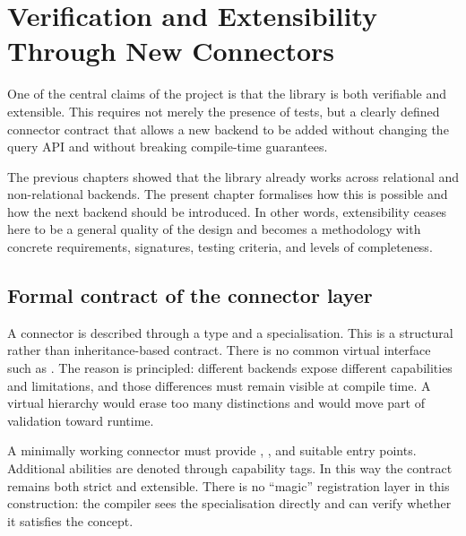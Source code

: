 \section{Verification and Extensibility Through New Connectors}
\label{sec:verification_extensibility}

One of the central claims of the project is that the library is both verifiable and extensible. This requires not merely the presence of tests, but a clearly defined connector contract that allows a new backend to be added without changing the query API and without breaking compile-time guarantees.

The previous chapters showed that the library already works across relational and non-relational backends. The present chapter formalises how this is possible and how the next backend should be introduced. In other words, extensibility ceases here to be a general quality of the design and becomes a methodology with concrete requirements, signatures, testing criteria, and levels of completeness.

\subsection{Formal contract of the connector layer}

A connector is described through a  type and a  specialisation. This is a structural rather than inheritance-based contract. There is no common virtual interface such as . The reason is principled: different backends expose different capabilities and limitations, and those differences must remain visible at compile time. A virtual hierarchy would erase too many distinctions and would move part of validation toward runtime.

A minimally working connector must provide , , and suitable  entry points. Additional abilities are denoted through capability tags. In this way the contract remains both strict and extensible. There is no ``magic'' registration layer in this construction: the compiler sees the specialisation directly and can verify whether it satisfies the  concept.

